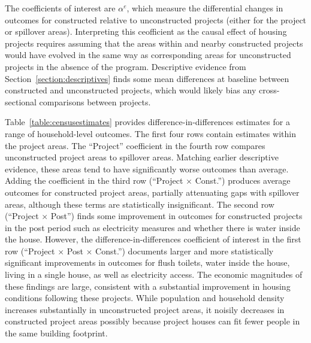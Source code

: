 \documentclass[12pt]{article}
\begin{document}
The coefficients of interest are $\alpha^e$, which measure the differential changes in outcomes for constructed relative to unconstructed projects (either for the project or spillover areas).  Interpreting this ceofficient as the causal effect of housing projects requires assuming that the areas within and nearby constructed projects would have evolved in the same way as corresponding areas for unconstructed projects in the absence of the program.  Descriptive evidence from Section~\ref{section:descriptives} finds some mean differences at baseline between constructed and unconstructed projects, which would likely bias any cross-sectional comparisons between projects. 


Table~\ref{table:censusestimates} provides difference-in-differences estimates for a range of household-level outcomes.  The first four rows contain estimates within the project areas.  The ``Project'' coefficient in the fourth row compares unconstructed project areas to spillover areas.  Matching earlier descriptive evidence, these areas tend to have significantly worse outcomes than average.  Adding the coefficient in the third row (``Project $\times$ Const.'') produces average outcomes for constructed project areas, partially attenuating gaps with spillover areas, although these terms are statistically insignificant.  The second row (``Project $\times$ Post'') finds some improvement in outcomes for constructed projects in the post period such as electricity measures and whether there is water inside the house.  However, the difference-in-differences coefficient of interest in the first row (``Project $\times$ Post $\times$ Const.'') documents larger and more statistically significant improvements in outcomes for flush toilets, water inside the house, living in a single house, as well as electricity access.  The economic magnitudes of these findings are large, consistent with a substantial improvement in housing conditions following these projects.  While population and household density increases substantially in unconstructed project areas, it noisily decreases in constructed project areas possibly because project houses can fit fewer people in the same building footprint.
\end{document}
